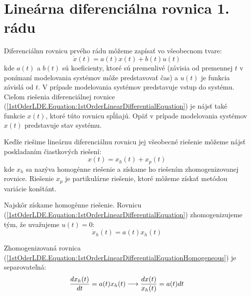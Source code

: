 \documentclass[a4paper, 10pt, ]{article}
\begin{document}
\bigskip

\normalsize
\normalfont



\section{Lineárna diferenciálna rovnica 1. rádu}

Diferenciálnu rovnicu prvého rádu môžeme zapísať vo všeobecnom tvare:
\begin{equation}
    \label{1stOderLDE.Equation:1stOrderLinearDifferentialEquation}
    \dot{x}(t) = a(t) x(t) + b(t) u(t)
\end{equation}
kde $a(t)$ a $b(t)$ sú koeficienty, ktoré sú premenlivé (závisia od premennej $t$ v ponímaní modelovania systémov môže predstavovať čas) a $u(t)$ je funkcia závislá od $t$. V prípade modelovania systémov predstavuje vstup do systému. Cieľom riešenia diferenciálnej rovnice (\ref{1stOderLDE.Equation:1stOrderLinearDifferentialEquation}) je nájsť také funkcie $x(t)$, ktoré túto rovnicu spĺňajú. Opäť v prípade modelovania systémov $x(t)$ predstavuje stav systému.

Keďže riešime lineárnu diferenciálnu rovnicu jej všeobecné riešenie môžeme nájsť poskladaním čiastkových riešení:
\begin{equation}
    \label{1stOderLDE.Equation:SolutionLinearCombination}
    x(t) = x_h(t) + x_p(t)
\end{equation}
kde $x_h$ sa nazýva homogénne riešenie a získame ho riešením zhomogenizovanej rovnice. Riešenie $x_p$ je partikulárne riešenie, ktoré môžeme získať metódou variácie konštánt.

Najskôr získame homogénne riešenie. Rovnicu (\ref{1stOderLDE.Equation:1stOrderLinearDifferentialEquation}) zhomogenizujeme tým, že uvažujeme $u(t) = 0$:
\begin{equation}
    \label{1stOderLDE.Equation:1stOrderLinearDifferentialEquationHomogeneous}
    \dot{x}_h(t) = a(t) x_h(t)
\end{equation}

\noindent Zhomogenizovaná rovnica (\ref{1stOderLDE.Equation:1stOrderLinearDifferentialEquationHomogeneous}) je separovateľná:
\begin{equation}
    \label{1stOderLDE.Equation:1stOrderLinearDifferentialEquationHomogeneousSeparated}
    \frac{d x_h(t)}{d t} = a(t) x_h(t) \longrightarrow \frac{dx(t)}{x_h(t)} = a(t)dt
\end{equation}
\end{document}
